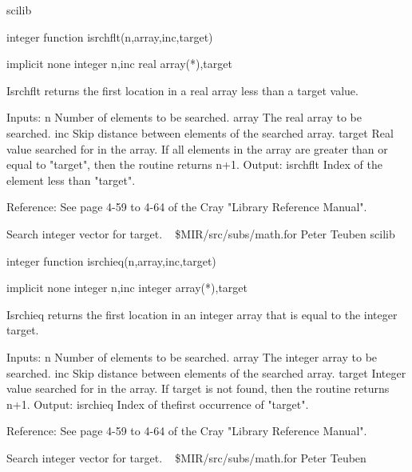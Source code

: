 \newline {} scilib
\par{\tenpoint
{\eightpoint\begintt
        integer function isrchflt(n,array,inc,target)

        implicit none
        integer n,inc
        real array(*),target

  Isrchflt returns the first location in a real array less than a target value.

  Inputs:
    n          Number of elements to be searched.
    array      The real array to be searched.
    inc        Skip distance between elements of the searched array.
    target     Real value searched for in the array. If all elements
               in the array are greater than or equal to "target", then
               the routine returns n+1.
  Output:
    isrchflt   Index of the element less than "target".

  Reference:
  See page 4-59 to 4-64 of the Cray "Library Reference Manual".
\endtt}
\par}
%
\noindent Search integer vector for target.
\newline \ 
\newline {} \$MIR/src/subs/math.for
\newline {} Peter Teuben
\newline {} scilib
\par{\tenpoint
{\eightpoint\begintt
        integer function isrchieq(n,array,inc,target)

        implicit none
        integer n,inc
        integer array(*),target

  Isrchieq returns the first location in an integer array that is equal
  to the integer target.

  Inputs:
    n          Number of elements to be searched.
    array      The integer array to be searched.
    inc        Skip distance between elements of the searched array.
    target     Integer value searched for in the array. If target is not
               found, then the routine returns n+1.
  Output:
    isrchieq   Index of thefirst occurrence of "target".

  Reference:
  See page 4-59 to 4-64 of the Cray "Library Reference Manual".
\endtt}
\par}
%
\noindent Search integer vector for target.
\newline \ 
\newline {} \$MIR/src/subs/math.for
\newline {} Peter Teuben
